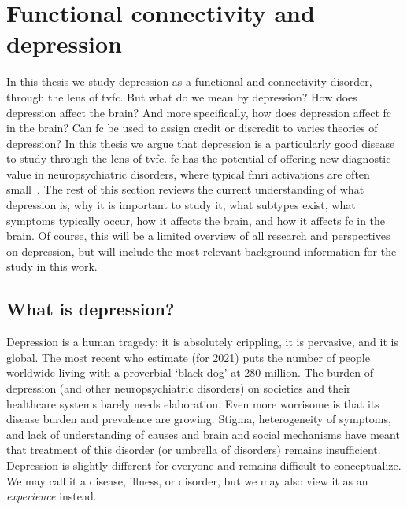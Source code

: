 \clearpage
\section{Functional connectivity and depression}\label{sec:fc-depression}

In this thesis we study depression as a functional and connectivity disorder, through the lens of \gls{tvfc}.
But what do we mean by depression?
How does depression affect the brain?
And more specifically, how does depression affect \gls{fc} in the brain?
Can \gls{fc} be used to assign credit or discredit to varies theories of depression?
In this thesis we argue that depression is a particularly good disease to study through the lens of \gls{tvfc}.
\gls{fc} has the potential of offering new diagnostic value in neuropsychiatric disorders, where typical \gls{fmri} activations are often small~\parencite{Fornito2012}.
The rest of this section reviews the current understanding of what depression is, why it is important to study it, what subtypes exist, what symptoms typically occur, how it affects the brain, and how it affects \gls{fc} in the brain.
Of course, this will be a limited overview of all research and perspectives on depression, but will include the most relevant background information for the study in this work.

\subsection{What is depression?}\label{subsec:depression}

Depression is a human tragedy: it is absolutely crippling, it is pervasive, and it is global.
The most recent \gls{who} estimate (for 2021) puts the number of people worldwide living with a proverbial `black dog' at 280 million.
The burden of depression (and other neuropsychiatric disorders) on societies and their healthcare systems barely needs elaboration.
Even more worrisome is that its disease burden and prevalence are growing.
Stigma, heterogeneity of symptoms, and lack of understanding of causes and brain and social mechanisms have meant that treatment of this disorder (or umbrella of disorders) remains insufficient.
Depression is slightly different for everyone and remains difficult to conceptualize.
We may call it a disease, illness, or disorder, but we may also view it as an \emph{experience} instead.

